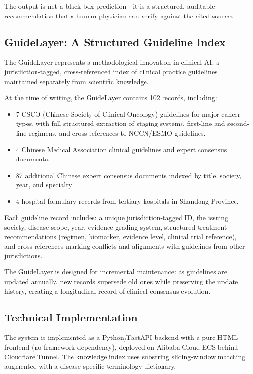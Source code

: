 \documentclass[11pt]{article}
\begin{document}
The output is not a black-box prediction---it is a structured, auditable 
recommendation that a human physician can verify against the cited sources.

\subsection{GuideLayer: A Structured Guideline Index}

The GuideLayer represents a methodological innovation in clinical AI: a 
jurisdiction-tagged, cross-referenced index of clinical practice guidelines 
maintained separately from scientific knowledge.

At the time of writing, the GuideLayer contains 102 records, including:

\begin{itemize}[leftmargin=*]
    \item 7 CSCO (Chinese Society of Clinical Oncology) guidelines for 
    major cancer types, with full structured extraction of staging systems, 
    first-line and second-line regimens, and cross-references to NCCN/ESMO 
    guidelines.
    \item 4 Chinese Medical Association clinical guidelines and expert 
    consensus documents.
    \item 87 additional Chinese expert consensus documents indexed by 
    title, society, year, and specialty.
    \item 4 hospital formulary records from tertiary hospitals in Shandong 
    Province.
\end{itemize}

Each guideline record includes: a unique jurisdiction-tagged ID, the 
issuing society, disease scope, year, evidence grading system, structured 
treatment recommendations (regimen, biomarker, evidence level, clinical 
trial reference), and cross-references marking conflicts and alignments 
with guidelines from other jurisdictions.

The GuideLayer is designed for incremental maintenance: as guidelines are 
updated annually, new records supersede old ones while preserving the 
update history, creating a longitudinal record of clinical consensus 
evolution.

\subsection{Technical Implementation}

The system is implemented as a Python/FastAPI backend with a pure HTML 
frontend (no framework dependency), deployed on Alibaba Cloud ECS behind 
Cloudflare Tunnel. The knowledge index uses substring sliding-window 
matching augmented with a disease-specific terminology dictionary. 
\end{document}
